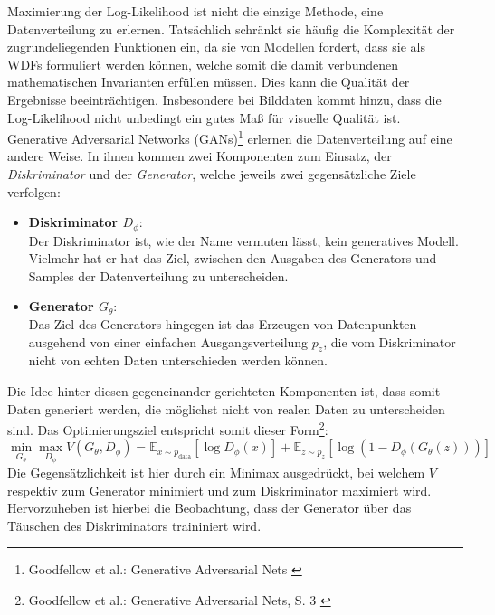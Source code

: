 Maximierung der Log-Likelihood ist nicht die einzige Methode, eine Datenverteilung zu erlernen. Tatsächlich schränkt sie häufig die Komplexität der zugrundeliegenden Funktionen ein, da sie von Modellen fordert, dass sie als \ac{WDF}s formuliert werden können, welche somit die damit verbundenen mathematischen Invarianten erfüllen müssen. Dies kann die Qualität der Ergebnisse beeinträchtigen. Insbesondere bei Bilddaten kommt hinzu, dass die Log-Likelihood nicht unbedingt ein gutes Maß für visuelle Qualität ist.\\
Generative Adversarial Networks (GANs)\footnote{
    Goodfellow et al.: Generative Adversarial Nets
    \cite{goodfellow2014generativeadversarialnetworks}
} erlernen die Datenverteilung auf eine andere Weise. In ihnen kommen zwei Komponenten zum Einsatz, der \textit{Diskriminator} und der \textit{Generator}, welche jeweils zwei gegensätzliche Ziele verfolgen:
\begin{itemize}
    \item \textbf{Diskriminator $D_\phi$}: \\
    Der Diskriminator ist, wie der Name vermuten lässt, kein generatives Modell. Vielmehr hat er hat das Ziel, zwischen den Ausgaben des Generators und Samples der Datenverteilung zu unterscheiden.
    \item \textbf{Generator $G_\theta$}: \\
    Das Ziel des Generators hingegen ist das Erzeugen von Datenpunkten ausgehend von einer einfachen Ausgangsverteilung $p_z$, die vom Diskriminator nicht von echten Daten unterschieden werden können. 
\end{itemize}
Die Idee hinter diesen gegeneinander gerichteten Komponenten ist, dass somit Daten generiert werden, die möglichst nicht von realen Daten zu unterscheiden sind. Das Optimierungsziel entspricht somit dieser Form\footnote{
    Goodfellow et al.: Generative Adversarial Nets, S. 3
    \cite{goodfellow2014generativeadversarialnetworks}
}:
\begin{equation}
    \min_{G_\theta}\max_{D_\phi}V(G_\theta, D_\phi)
    = \mathbb E_{x \sim p_\text{data}}[\log D_\phi(x)] 
    + \mathbb E_{z \sim p_z}[\log (1 - D_\phi(G_\theta(z)))]
\end{equation}
Die Gegensätzlichkeit ist hier durch ein Minimax ausgedrückt, bei welchem $V$ respektiv zum Generator minimiert und zum Diskriminator maximiert wird. Hervorzuheben ist hierbei die Beobachtung, dass der Generator über das Täuschen des Diskriminators traininiert wird. \\
